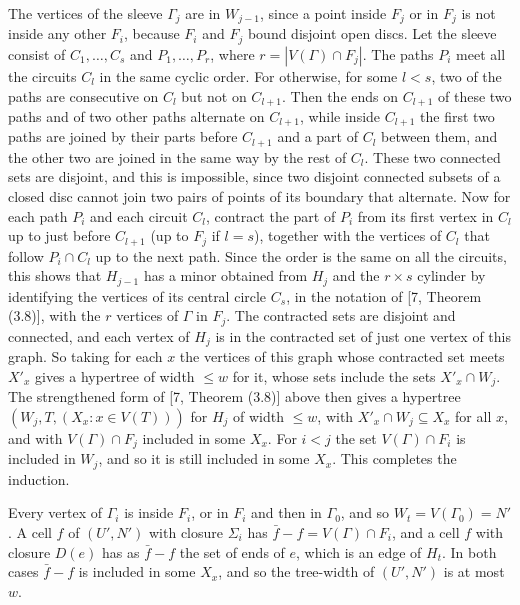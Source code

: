 {The vertices of the sleeve $\Gamma_j$ are in $W_{j-1}$, since a point inside $F_j$ or in $F_j$ is not
inside any other $F_i$, because $F_i$ and $F_j$ bound disjoint open discs. Let the sleeve consist
of $C_1, \dots, C_s$ and $P_1, \dots, P_r$, where $r = |V(\Gamma) \cap F_j|$. The paths $P_i$ meet
all the circuits $C_l$ in the same cyclic order. For otherwise, for some $l < s$, two of the paths
are consecutive on $C_l$ but not on $C_{l+1}$. Then the ends on $C_{l+1}$ of these two paths and of
two other paths alternate on $C_{l+1}$, while inside $C_{l+1}$ the first two paths are joined by their
parts before $C_{l+1}$ and a part of $C_l$ between them, and the other two are joined in the same way
by the rest of $C_l$. These two connected sets are disjoint, and this is impossible, since two
disjoint connected subsets of a closed disc cannot join two pairs of points of its boundary that
alternate. Now for each path $P_i$ and each circuit $C_l$, contract the part of $P_i$ from
its first vertex in $C_l$ up to just before $C_{l+1}$ (up to $F_j$ if $l = s$), together with the
vertices of $C_l$ that follow $P_i \cap C_l$ up to the next path. Since the order is the same on all
the circuits, this shows that $H_{j-1}$ has a minor obtained from $H_j$ and the $r \times s$
cylinder by identifying the vertices of its central circle $C_s$, in the notation of [7, Theorem
(3.8)], with the $r$ vertices of $\Gamma$ in $F_j$. The contracted sets are disjoint and connected, and each
vertex of $H_j$ is in the contracted set of just one vertex of this graph. So taking for each $x$ the vertices of this graph whose
contracted set meets $X'_x$ gives a hypertree of width $\le w$ for it, whose sets include the sets
$X'_x \cap W_j$. The strengthened form of [7, Theorem (3.8)] above then gives a hypertree
$(W_j, T, (X_x : x \in V(T)))$ for $H_j$ of width $\le w$, with $X'_x \cap W_j \subseteq X_x$ for
all $x$, and with $V(\Gamma) \cap F_j$ included in some $X_x$. For $i < j$ the set
$V(\Gamma) \cap F_i$ is included in $W_j$, and so it is still included in some $X_x$. This completes
the induction.

Every vertex of $\Gamma_i$ is inside $F_i$, or in $F_i$ and then in $\Gamma_0$, and so
$W_t = V(\Gamma_0) = N'$. A cell $f$ of $(U', N')$ with closure $\Sigma_i$ has
$\bar{f} - f = V(\Gamma) \cap F_i$, and a cell $f$ with closure $D(e)$ has as $\bar{f} - f$ the set
of ends of $e$, which is an edge of $H_t$. In both cases $\bar{f} - f$ is included in some $X_x$, and
so the tree-width of $(U', N')$ is at most $w$.}

